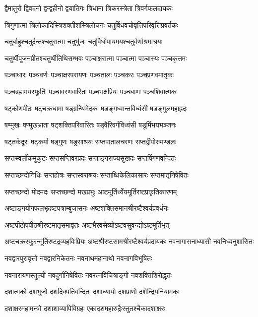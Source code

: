 \twolineshloka
{द्वैमातुरो द्विवदनो द्वन्द्वहीनो द्वयातिगः}
{त्रिधामा त्रिकरस्त्रेता त्रिवर्गफलदायकः}%

\twolineshloka
{त्रिगुणात्मा त्रिलोकादिस्त्रिशक्तीशस्त्रिलोचनः}
{चतुर्विधवचोवृत्तिपरिवृत्तिप्रवर्तकः}%

\twolineshloka
{चतुर्बाहुश्चतुर्दन्तश्चतुरात्मा चतुर्भुजः}
{चतुर्विधोपायमयश्चतुर्वर्णाश्रमाश्रयः}%

\twolineshloka
{चतुर्थीपूजनप्रीतश्चतुर्थीतिथिसम्भवः}
{पञ्चाक्षरात्मा पञ्चात्मा पञ्चास्यः पञ्चकृत्तमः}%

\twolineshloka
{पञ्चाधारः पञ्चवर्णः पञ्चाक्षरपरायणः}
{पञ्चतालः पञ्चकरः पञ्चप्रणवमातृकः}%

\twolineshloka
{पञ्चब्रह्ममयस्फूर्तिः पञ्चावरणवारितः}
{पञ्चभक्षप्रियः पञ्चबाणः पञ्चशिवात्मकः}%

\twolineshloka
{षट्कोणपीठः षट्चक्रधामा षड्ग्रन्थिभेदकः}
{षडङ्गध्वान्तविध्वंसी षडङ्गुलमहाह्रदः}%

\twolineshloka
{षण्मुखः षण्मुखभ्राता षट्शक्तिपरिवारितः}
{षड्वैरिवर्गविध्वंसी षडूर्मिभयभञ्जनः}%

\twolineshloka
{षट्तर्कदूरः षट्कर्मा षड्गुणः षड्रसाश्रयः}
{सप्तपातालचरणः सप्तद्वीपोरुमण्डलः}%

\twolineshloka
{सप्तस्वर्लोकमुकुटः सप्तसप्तिवरप्रदः}
{सप्ताङ्गराज्यसुखदः सप्तर्षिगणवन्दितः}%

\twolineshloka
{सप्तच्छन्दोनिधिः सप्तहोत्रः सप्तस्वराश्रयः}
{सप्ताब्धिकेलिकासारः सप्तमातृनिषेवितः}%

\twolineshloka
{सप्तच्छन्दो मोदमदः सप्तच्छन्दो मखप्रभुः}
{अष्टमूर्तिर्ध्येयमूर्तिरष्टप्रकृतिकारणम्}%

\twolineshloka
{अष्टाङ्गयोगफलभृदष्टपत्राम्बुजासनः}
{अष्टशक्तिसमानश्रीरष्टैश्वर्यप्रवर्धनः}%

\twolineshloka
{अष्टपीठोपपीठश्रीरष्टमातृसमावृतः}
{अष्टभैरवसेव्योऽष्टवसुवन्द्योऽष्टमूर्तिभृत्}%

\threelineshloka
{अष्टचक्रस्फुरन्मूर्तिरष्टद्रव्यहविःप्रियः}
{अष्टश्रीरष्टसामश्रीरष्टैश्वर्यप्रदायकः}
{नवनागासनाध्यासी नवनिध्यनुशासितः}%

\twolineshloka
{नवद्वारपुरावृत्तो नवद्वारनिकेतनः}
{नवनाथमहानाथो नवनागविभूषितः}%

\twolineshloka
{नवनारायणस्तुल्यो नवदुर्गानिषेवितः}
{नवरत्नविचित्राङ्गो नवशक्तिशिरोद्धृतः}%

\twolineshloka
{दशात्मको दशभुजो दशदिक्पतिवन्दितः}
{दशाध्यायो दशप्राणो दशेन्द्रियनियामकः}%

\twolineshloka
{दशाक्षरमहामन्त्रो दशाशाव्यापिविग्रहः}
{एकादशमहारुद्रैःस्तुतश्चैकादशाक्षरः}%

